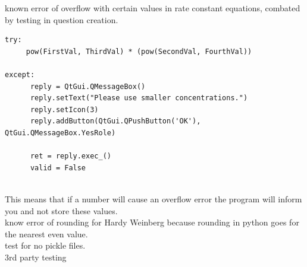 \documentclass[a4paper,12pt]{report}
\begin{document}
known error of overflow with certain values in rate constant equations, combated by testing in question creation.
\begin{lstlisting}[style = customc]
 try:
     pow(FirstVal, ThirdVal) * (pow(SecondVal, FourthVal))
                      
except:
      reply = QtGui.QMessageBox()
      reply.setText("Please use smaller concentrations.")
      reply.setIcon(3)
      reply.addButton(QtGui.QPushButton('OK'), QtGui.QMessageBox.YesRole)

      ret = reply.exec_()
      valid = False


\end{lstlisting}
This means that if a number will cause an overflow error the program will inform you and not store these values.\\
know error of rounding for Hardy Weinberg because rounding in python goes for the nearest even value.\\
test for no pickle files.\\
3rd party testing
\end{document}

